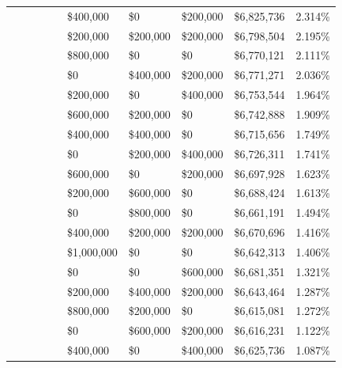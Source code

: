 \documentclass[11pt]{article}
\begin{document}
\begin{figure}
\begin{tabular}{ |p{1.0cm}p{1.0cm}p{1.0cm}p{2.0cm}|p{1.0cm}||p{1.0cm}p{1.0cm}p{1.0cm}p{2.0cm}|p{1.0cm}|}
&&&&                                                & \$400,000 & \$0& \$200,000 & \$6,825,736  & 2.314\% \\
&&&&                                                & \$200,000& \$200,000& \$200,000 & \$6,798,504  & 2.195\% \\
&&&&                                                & \$800,000 & \$0 & \$0 & \$6,770,121  & 2.111\% \\
&&&&                                                & \$0& \$400,000& \$200,000 & \$6,771,271  & 2.036\% \\
&&&&                                                & \$200,000 & \$0& \$400,000 & \$6,753,544  & 1.964\% \\
&&&&                                                & \$600,000& \$200,000 & \$0 & \$6,742,888  & 1.909\% \\
&&&&                                                & \$400,000& \$400,000 & \$0 & \$6,715,656  & 1.749\% \\
&&&&                                                & \$0& \$200,000& \$400,000 & \$6,726,311  & 1.741\% \\
&&&&                                                & \$600,000 & \$0& \$200,000 & \$6,697,928  & 1.623\% \\
&&&&                                                & \$200,000 & \$600,000 & \$0 & \$6,688,424  & 1.613\% \\
&&&&                                                & \$0& \$800,000 & \$0 & \$6,661,191  & 1.494\% \\
&&&&                                                & \$400,000& \$200,000& \$200,000 & \$6,670,696  & 1.416\% \\
&&&&                                                & \$1,000,000 & \$0 & \$0& \$6,642,313  & 1.406\% \\
&&&&                                                & \$0 & \$0 & \$600,000 & \$6,681,351  & 1.321\% \\
&&&&                                                & \$200,000& \$400,000& \$200,000 & \$6,643,464  & 1.287\% \\
&&&&                                                & \$800,000& \$200,000 & \$0 & \$6,615,081  & 1.272\% \\
&&&&                                                & \$0 & \$600,000& \$200,000 & \$6,616,231  & 1.122\% \\
&&&&                                                & \$400,000 & \$0& \$400,000 & \$6,625,736  & 1.087\% \\

\end{tabular}
\end{figure}
\end{document}
